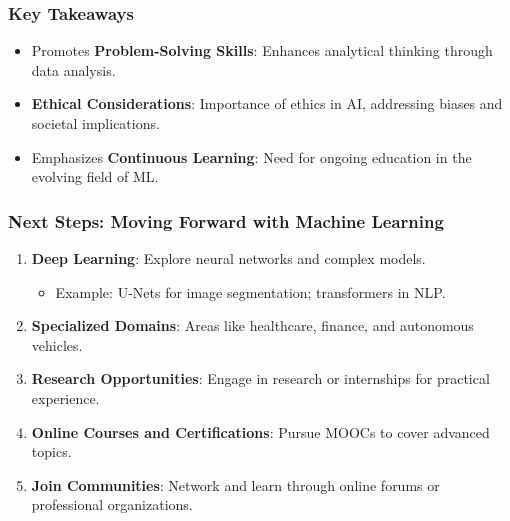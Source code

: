 \documentclass[aspectratio=169]{beamer}
\begin{document}
\begin{frame}[fragile]
    \frametitle{Key Takeaways}
    
    \begin{itemize}
        \item Promotes \textbf{Problem-Solving Skills}: Enhances analytical thinking through data analysis.
        \item \textbf{Ethical Considerations}: Importance of ethics in AI, addressing biases and societal implications.
        \item Emphasizes \textbf{Continuous Learning}: Need for ongoing education in the evolving field of ML.
    \end{itemize}
\end{frame}

\begin{frame}[fragile]
    \frametitle{Next Steps: Moving Forward with Machine Learning}

    \begin{enumerate}
        \item \textbf{Deep Learning}: Explore neural networks and complex models.
        \begin{itemize}
            \item Example: U-Nets for image segmentation; transformers in NLP.
        \end{itemize}
        
        \item \textbf{Specialized Domains}: Areas like healthcare, finance, and autonomous vehicles.
        
        \item \textbf{Research Opportunities}: Engage in research or internships for practical experience.
        
        \item \textbf{Online Courses and Certifications}: Pursue MOOCs to cover advanced topics.
        
        \item \textbf{Join Communities}: Network and learn through online forums or professional organizations.
    \end{enumerate}
\end{frame}
\end{document}
